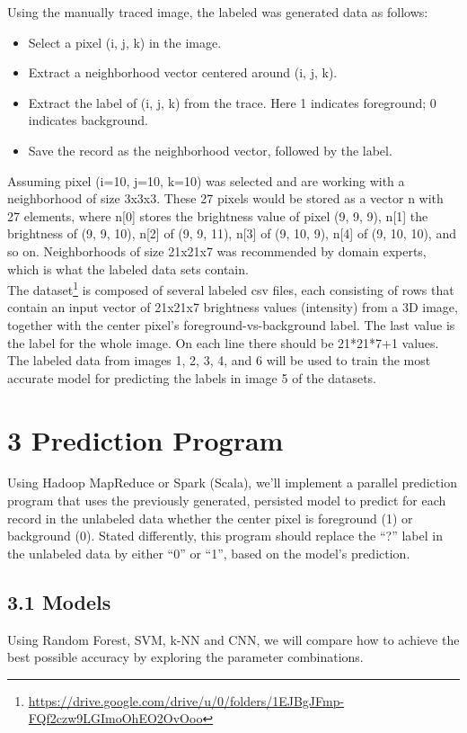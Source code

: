 \documentclass{neu_handout}
\begin{document}
Using the manually traced image, the labeled was generated data as follows:

\begin{itemize}
  \item Select a pixel (i, j, k) in the image.
  \item Extract a neighborhood vector centered around (i, j, k).
  \item Extract the label of (i, j, k) from the trace. Here 1 indicates foreground; 0 indicates background.
  \item  Save the record as the neighborhood vector, followed by the label.
\end{itemize}

Assuming pixel (i=10, j=10, k=10) was selected and are working with a neighborhood of size 3x3x3. These 27 pixels would be stored as a vector n with 27 elements, where n[0] stores the brightness value of
pixel (9, 9, 9), n[1] the brightness of (9, 9, 10), n[2] of (9, 9, 11), n[3] of (9, 10, 9), n[4] of (9, 10, 10), and
so on. Neighborhoods of size 21x21x7 was recommended by domain experts, which is what the labeled data sets contain.\\

The dataset\footnote{\url{https://drive.google.com/drive/u/0/folders/1EJBgJFmp-FQf2czw9LGImoOhEO2OvOoo}} is composed of several labeled csv files, each consisting of rows that contain an input vector of 21x21x7
brightness values (intensity) from a 3D image, together with the center pixel’s foreground-vs-background label. The last value is the label for the whole image. On each line there should be 21*21*7+1 values. The labeled data from images 1, 2, 3, 4, and 6 will be used to train the most accurate model for predicting the labels in image 5 of the datasets.

\section*{3 Prediction Program}
Using Hadoop MapReduce or Spark (Scala), we'll implement a parallel prediction program that uses the previously generated, persisted model to predict for each record in the unlabeled data whether the center pixel is foreground (1) or background (0). Stated differently, this program should replace the “?” label in the unlabeled data by either “0” or “1”, based on the model’s prediction.

\subsection*{3.1 Models}
Using Random Forest, SVM, k-NN and CNN, we will compare how to achieve the best possible accuracy by exploring the parameter combinations.\\
\end{document}
